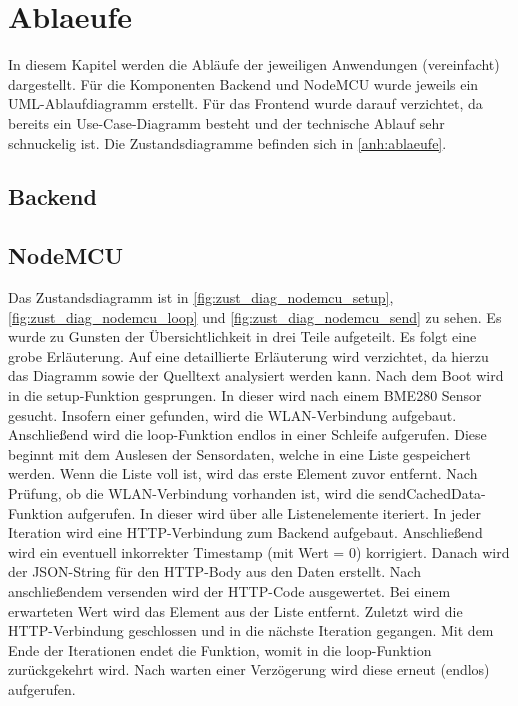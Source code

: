 \usepackage{hyperref}

\section{Ablaeufe}\label{Ablaeufe}
In diesem Kapitel werden die Abläufe der jeweiligen Anwendungen (vereinfacht) dargestellt. Für die Komponenten
Backend und NodeMCU wurde jeweils ein UML-Ablaufdiagramm erstellt. Für das Frontend wurde darauf verzichtet, da bereits
ein Use-Case-Diagramm besteht und der technische Ablauf sehr schnuckelig ist. Die Zustandsdiagramme befinden sich in
\autoref{anh:ablaeufe}.
\subsection{Backend}
\subsection{NodeMCU}
Das Zustandsdiagramm ist in \autoref{fig:zust_diag_nodemcu_setup}, \autoref{fig:zust_diag_nodemcu_loop} und
\autoref{fig:zust_diag_nodemcu_send} zu sehen. Es wurde zu Gunsten der Übersichtlichkeit in drei Teile aufgeteilt.
Es folgt eine grobe Erläuterung.
Auf eine detaillierte Erläuterung wird verzichtet, da hierzu das Diagramm sowie der Quelltext analysiert werden kann.
Nach dem Boot wird in die setup-Funktion gesprungen.
In dieser wird nach einem BME280 Sensor gesucht.
Insofern einer gefunden, wird die WLAN-Verbindung aufgebaut.
Anschließend wird die loop-Funktion endlos in einer Schleife aufgerufen.
Diese beginnt mit dem Auslesen der Sensordaten, welche in eine Liste gespeichert werden.
Wenn die Liste voll ist, wird das erste Element zuvor entfernt.
Nach Prüfung, ob die WLAN-Verbindung vorhanden ist, wird die sendCachedData-Funktion aufgerufen.
In dieser wird über alle Listenelemente iteriert.
In jeder Iteration wird eine HTTP-Verbindung zum Backend aufgebaut.
Anschließend wird ein eventuell inkorrekter Timestamp (mit Wert = 0) korrigiert.
Danach wird der JSON-String für den HTTP-Body aus den Daten erstellt.
Nach anschließendem versenden wird der HTTP-Code ausgewertet.
Bei einem erwarteten Wert wird das Element aus der Liste entfernt.
Zuletzt wird die HTTP-Verbindung geschlossen und in die nächste Iteration gegangen.
Mit dem Ende der Iterationen endet die Funktion, womit in die loop-Funktion zurückgekehrt wird.
Nach warten einer Verzögerung wird diese erneut (endlos) aufgerufen.
